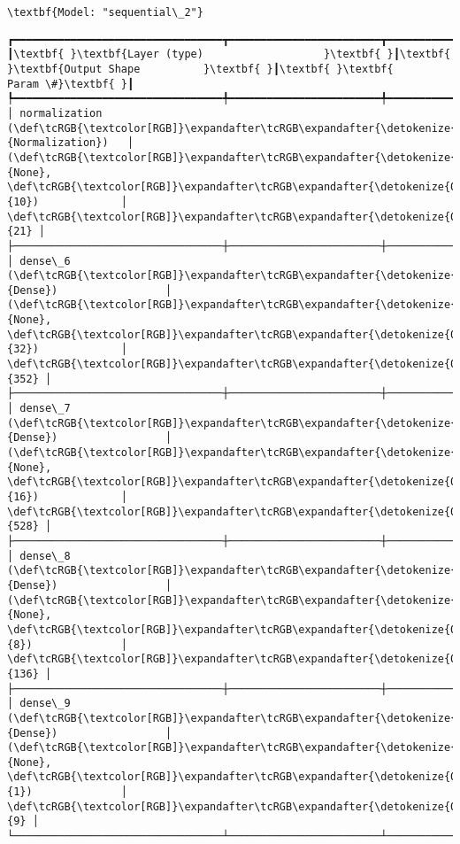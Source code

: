 \documentclass[11pt]{article}
\begin{document}
    
    \begin{Verbatim}[commandchars=\\\{\}]
\textbf{Model: "sequential\_2"}

    \end{Verbatim}

    
    
    \begin{Verbatim}[commandchars=\\\{\}]
┏━━━━━━━━━━━━━━━━━━━━━━━━━━━━━━━━━┳━━━━━━━━━━━━━━━━━━━━━━━━┳━━━━━━━━━━━━━━━┓
┃\textbf{ }\textbf{Layer (type)                   }\textbf{ }┃\textbf{ }\textbf{Output Shape          }\textbf{ }┃\textbf{ }\textbf{      Param \#}\textbf{ }┃
┡━━━━━━━━━━━━━━━━━━━━━━━━━━━━━━━━━╇━━━━━━━━━━━━━━━━━━━━━━━━╇━━━━━━━━━━━━━━━┩
│ normalization (\def\tcRGB{\textcolor[RGB]}\expandafter\tcRGB\expandafter{\detokenize{0,135,255}}{Normalization})   │ (\def\tcRGB{\textcolor[RGB]}\expandafter\tcRGB\expandafter{\detokenize{0,215,255}}{None}, \def\tcRGB{\textcolor[RGB]}\expandafter\tcRGB\expandafter{\detokenize{0,175,0}}{10})             │            \def\tcRGB{\textcolor[RGB]}\expandafter\tcRGB\expandafter{\detokenize{0,175,0}}{21} │
├─────────────────────────────────┼────────────────────────┼───────────────┤
│ dense\_6 (\def\tcRGB{\textcolor[RGB]}\expandafter\tcRGB\expandafter{\detokenize{0,135,255}}{Dense})                 │ (\def\tcRGB{\textcolor[RGB]}\expandafter\tcRGB\expandafter{\detokenize{0,215,255}}{None}, \def\tcRGB{\textcolor[RGB]}\expandafter\tcRGB\expandafter{\detokenize{0,175,0}}{32})             │           \def\tcRGB{\textcolor[RGB]}\expandafter\tcRGB\expandafter{\detokenize{0,175,0}}{352} │
├─────────────────────────────────┼────────────────────────┼───────────────┤
│ dense\_7 (\def\tcRGB{\textcolor[RGB]}\expandafter\tcRGB\expandafter{\detokenize{0,135,255}}{Dense})                 │ (\def\tcRGB{\textcolor[RGB]}\expandafter\tcRGB\expandafter{\detokenize{0,215,255}}{None}, \def\tcRGB{\textcolor[RGB]}\expandafter\tcRGB\expandafter{\detokenize{0,175,0}}{16})             │           \def\tcRGB{\textcolor[RGB]}\expandafter\tcRGB\expandafter{\detokenize{0,175,0}}{528} │
├─────────────────────────────────┼────────────────────────┼───────────────┤
│ dense\_8 (\def\tcRGB{\textcolor[RGB]}\expandafter\tcRGB\expandafter{\detokenize{0,135,255}}{Dense})                 │ (\def\tcRGB{\textcolor[RGB]}\expandafter\tcRGB\expandafter{\detokenize{0,215,255}}{None}, \def\tcRGB{\textcolor[RGB]}\expandafter\tcRGB\expandafter{\detokenize{0,175,0}}{8})              │           \def\tcRGB{\textcolor[RGB]}\expandafter\tcRGB\expandafter{\detokenize{0,175,0}}{136} │
├─────────────────────────────────┼────────────────────────┼───────────────┤
│ dense\_9 (\def\tcRGB{\textcolor[RGB]}\expandafter\tcRGB\expandafter{\detokenize{0,135,255}}{Dense})                 │ (\def\tcRGB{\textcolor[RGB]}\expandafter\tcRGB\expandafter{\detokenize{0,215,255}}{None}, \def\tcRGB{\textcolor[RGB]}\expandafter\tcRGB\expandafter{\detokenize{0,175,0}}{1})              │             \def\tcRGB{\textcolor[RGB]}\expandafter\tcRGB\expandafter{\detokenize{0,175,0}}{9} │
└─────────────────────────────────┴────────────────────────┴───────────────┘

    \end{Verbatim}
\end{document}
